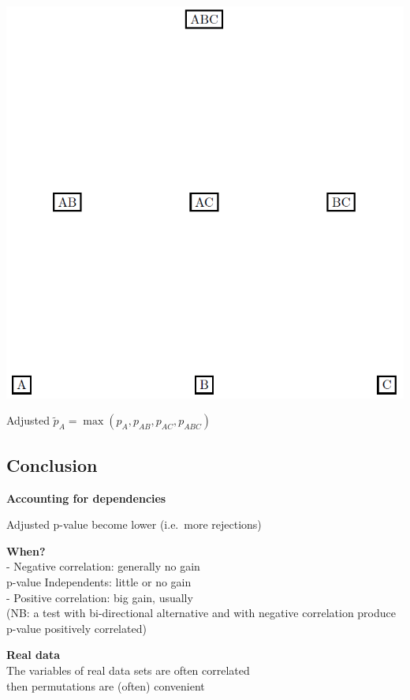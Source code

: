 \documentclass[
]{article}
\begin{document}
\begin{center}\includegraphics[width=9.82in]{./figs/closed_set} \end{center}

Adjusted \(\tilde p_A=\max(p_A,p_{AB},p_{AC},p_{ABC})\)

\hypertarget{conclusion-1}{%
\subsection{Conclusion}\label{conclusion-1}}

\textbf{Accounting for dependencies}

Adjusted p-value become lower (i.e.~more rejections)

\textbf{When?}\\
- Negative correlation: generally no gain\\
p-value Independents: little or no gain\\
- Positive correlation: big gain, usually\\
(NB: a test with bi-directional alternative and with negative
correlation produce p-value positively correlated)

\textbf{Real data}\\
The variables of real data sets are often correlated\\
then permutations are (often) convenient
\end{document}
